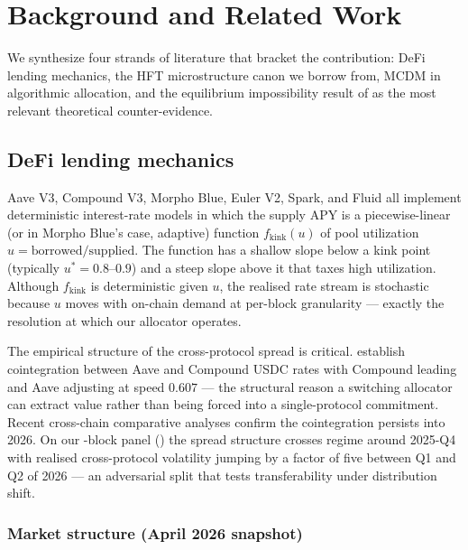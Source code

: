 \section{Background and Related Work}
\label{sec:background}

We synthesize four strands of literature that bracket the
contribution: DeFi lending mechanics, the HFT microstructure canon
we borrow from, MCDM in algorithmic allocation, and the equilibrium
impossibility result of \cite{halpern2024fair} as the most relevant
theoretical counter-evidence.

\subsection{DeFi lending mechanics}
\label{sec:bg-defi-mechanics}

Aave V3, Compound V3, Morpho Blue, Euler V2, Spark, and Fluid all
implement deterministic interest-rate models in which the supply
APY is a piecewise-linear (or in Morpho Blue's case, adaptive)
function $f_{\text{kink}}(u)$ of pool utilization
$u = \text{borrowed} / \text{supplied}$.  The function has a
shallow slope below a kink point (typically $u^{*} = 0.8$--$0.9$)
and a steep slope above it that taxes high utilization.  Although
$f_{\text{kink}}$ is deterministic given $u$, the realised rate
stream is stochastic because $u$ moves with on-chain demand at
per-block granularity --- exactly the resolution at which our
allocator operates.

The empirical structure of the cross-protocol spread is critical.
\cite{gudgeon2020loanable} establish cointegration between Aave
and Compound USDC rates with Compound leading and Aave adjusting
at speed $0.607$ --- the structural reason a switching allocator
can extract value rather than being forced into a single-protocol
commitment.  Recent cross-chain comparative analyses
\cite{aavecompoundcrosschain2025} confirm the cointegration
persists into 2026.  On our \NBlocksFull-block panel
() the spread structure crosses regime around
2025-Q4 with realised cross-protocol volatility jumping by a
factor of five between Q1 and Q2 of 2026 --- an adversarial split
that tests transferability under distribution shift.

\subsubsection{Market structure (April 2026 snapshot)}
\label{sec:bg-market-structure}


